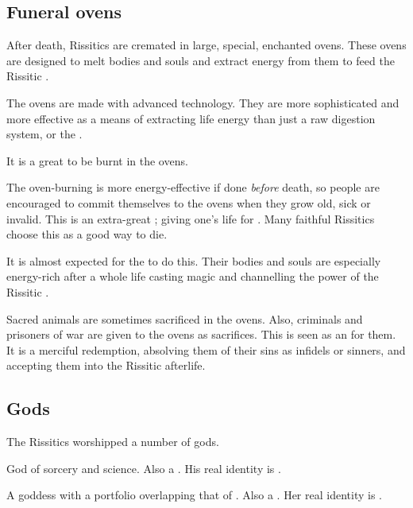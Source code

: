 \subsection{Funeral ovens}
After death, Rissitics are cremated in large, special, enchanted ovens. 
These ovens are designed to melt bodies and souls and extract energy from them to feed the Rissitic \matrix. 

The ovens are made with advanced technology. 
They are more sophisticated and more effective as a means of extracting life energy than just a raw digestion system, or the \psp{\resphain} . 

It is a great \honour to be burnt in the ovens.

The oven-burning is more energy-effective if done \emph{before} death, so people are encouraged to commit themselves to the ovens when they grow old, sick or invalid. 
This is an extra-great \honour; giving one's life for \Nechsain. 
Many faithful Rissitics choose this as a good way to die. 

It is almost expected for the \nyzlet{} to do this. 
Their bodies and souls are especially energy-rich after a whole life casting magic and channelling the power of the Rissitic \matrix. 

Sacred animals are sometimes sacrificed in the ovens. 
Also, criminals and prisoners of war are given to the ovens as sacrifices. 
This is seen as an \honour for them. 
It is a merciful redemption, absolving them of their sins as infidels or sinners, and accepting them into the Rissitic afterlife. 









\subsection{Gods}
The Rissitics worshipped a number of gods. 


\begin{gloss}  
  \begin{comment}
  \subparagraph{Rissit}
  \end{comment}
  God of sorcery and science. 
  Also a .
  His real identity is . 

  
  
  \begin{comment}
  \subparagraph{\Usherain}
  \end{comment}
  \gitemlink[Usherain]{\Usherain}
  \index{\Usherain}
  A goddess with a portfolio overlapping that of . 
  Also a .
  Her real identity is . 



\end{gloss}









